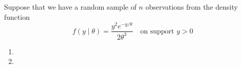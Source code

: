 Suppose that we have a random sample of $n$ observations from the density function $$f(y \mid \theta)=\dfrac{y^2e^{-y/\theta}}{2\theta^3} \quad \text{on support } y > 0$$
\begin{enumerate}[label=(\alph*)]
    \item \vspace{1in}
    \item 
\end{enumerate}

